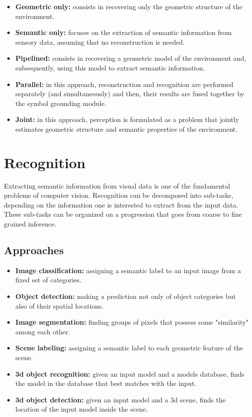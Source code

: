 \documentclass{article}
\begin{document}
	\begin{itemize}
		\item {\bf Geometric only:} consists in recovering only the geometric structure of the environment.
		\item {\bf Semantic only:} focuses on the extraction of semantic information from sensory data, assuming that no reconstruction is needed.
		\item {\bf Pipelined:} consists in recovering a geometric model of the environment and, subsequently, using this model to extract semantic information.
		\item {\bf Parallel:} in this approach, reconstruction and recognition are performed separately (and simultaneously) and then, their results are fused together by the symbol grounding module.
		\item {\bf Joint:} in this approach, perception is formulated as a problem that jointly estimates geometric structure and semantic properties of the environment. 
	\end{itemize}
	
	\section{Recognition}
	
	Extracting semantic information from visual data is one of the  fundamental problems of computer vision. Recognition can be decomposed into sub-tasks, depending on the information one is interested to extract from the input data. These sub-tasks can be organized on a progression that goes from coarse to fine grained inference.
	
	\subsection{Approaches}
	
	\begin{itemize}
		\item {\bf Image classification:} assigning a semantic label to an input image from a fixed set of categories.
		\item {\bf Object detection:} making a prediction not only of object categories but also of their spatial locations.
		\item {\bf Image segmentation:} finding groups of pixels that possess some "similarity" among each other.
		\item {\bf Scene labeling:} assigning a semantic label to each geometric feature of the scene.
		\item {\bf 3d object recognition:} given an input model and a models database, finds the model in the database that best matches with the input.
		\item {\bf 3d object detection:} given an input model and a 3d scene, finds the location of the input model inside the scene.
	\end{itemize}
	
\end{document}
